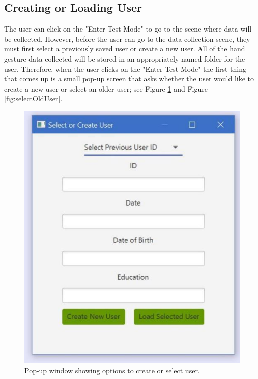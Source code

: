 \subsection{Creating or Loading User}
The user can click on the "Enter Test Mode" to go to the scene where data will be collected. However, before the user can go to the data collection scene, they must first select a previously saved user or create a new user. All of the hand gesture data collected will be stored in an appropriately named folder for the user. Therefore, when the user clicks on the "Enter Test Mode" the first thing that comes up is a small pop-up screen that asks whether the user would like to create a new user or select an older user; see Figure \ref{fig:createNewUser} and Figure \ref{fig:selectOldUser}. 
\begin{figure}[H]
    \centering
    \begin{minipage}{0.5\textwidth}
        \centering
        \includegraphics[scale=.55]{Figures/6_selectUser.JPG} 
        \caption{Pop-up window showing options to create or select user. }
		\label{fig:createNewUser}
    \end{minipage}\hfill
    \begin{minipage}{0.5\textwidth}

\end{minipage}
\end{figure}
